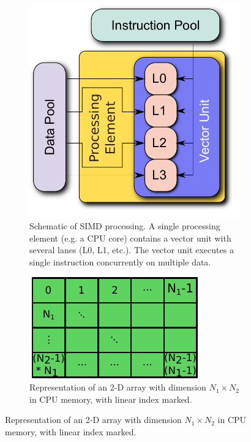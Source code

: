 \documentclass[12pt]{ussci}
\begin{document}
\begin{figure}[htb]
  \centering
  \begin{subfigure}[t]{0.45\linewidth}
      \includegraphics[width=\textwidth]{SIMD.pdf}
      \caption{Schematic of SIMD processing.  A single processing element (e.g. a CPU core) contains a vector unit with several lanes (L0, L1, etc.).  The vector unit executes a single instruction concurrently on multiple data.}
      \label{F:SIMD}
  \end{subfigure}
  \hfill
  \begin{subfigure}[t]{0.45\linewidth}
      \includegraphics[width=\textwidth]{mem_access.pdf}
      \caption{Representation of an 2-D array with dimension $N_1 \times N_2$ in CPU memory, with linear index marked.}
      \label{F:mem}
  \end{subfigure}
\end{figure}
\end{document}
